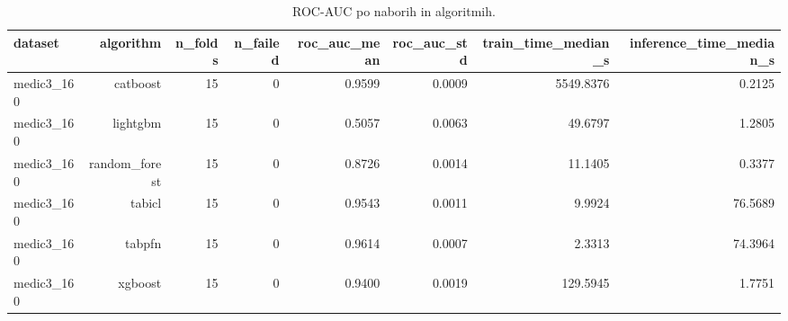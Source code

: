 \begin{table}[htbp]
\centering
\caption{ROC-AUC po naborih in algoritmih.}
\label{tab:per-dataset}
\begin{tabular}{lrrrrrrr}
\hline
dataset & algorithm & n\_folds & n\_failed & roc\_auc\_mean & roc\_auc\_std & train\_time\_median\_s & inference\_time\_median\_s \\
\hline
medic3\_160 & catboost & 15 & 0 & 0.9599 & 0.0009 & 5549.8376 & 0.2125 \\
medic3\_160 & lightgbm & 15 & 0 & 0.5057 & 0.0063 & 49.6797 & 1.2805 \\
medic3\_160 & random\_forest & 15 & 0 & 0.8726 & 0.0014 & 11.1405 & 0.3377 \\
medic3\_160 & tabicl & 15 & 0 & 0.9543 & 0.0011 & 9.9924 & 76.5689 \\
medic3\_160 & tabpfn & 15 & 0 & 0.9614 & 0.0007 & 2.3313 & 74.3964 \\
medic3\_160 & xgboost & 15 & 0 & 0.9400 & 0.0019 & 129.5945 & 1.7751 \\
\hline
\end{tabular}
\end{table}
